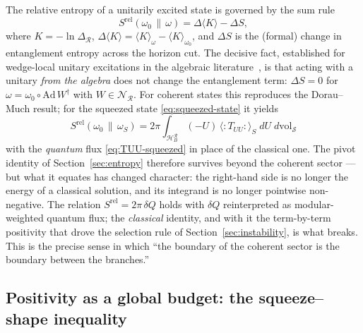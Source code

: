\documentclass[11pt]{article}
\newcommand{\Srel}{S^{\mathrm{rel}}}
\begin{document}
The relative entropy of a unitarily excited state is governed by the sum rule
\begin{equation}
\Srel(\omega_0\,\|\,\omega)
= \Delta\langle K \rangle - \Delta S,
\label{eq:sumrule}
\end{equation}
where $K = -\ln \Delta_{\mathcal{R}}$, $\Delta\langle K\rangle = \langle K \rangle_\omega - \langle K\rangle_{\omega_0}$, and $\Delta S$ is the (formal) change in entanglement entropy across the horizon cut. The decisive fact, established for wedge-local unitary excitations in the algebraic literature~\cite{FLPW,Longo2019,CLR}, is that acting with a unitary \emph{from the algebra} does not change the entanglement term: $\Delta S = 0$ for $\omega = \omega_0 \circ \mathrm{Ad}\,W^\dagger$ with $W \in \mathscr{N}_{\mathcal{R}}$. For coherent states this reproduces the Dorau--Much result; for the squeezed state \eqref{eq:squeezed-state} it yields
\begin{equation}
\boxed{\;
\Srel(\omega_0\,\|\,\omega_S)
= 2\pi \int_{\mathcal{H}_B^{\mathcal{R}}} (-U)\,
\big\langle{:}T_{UU}{:}\big\rangle_{S}\; dU\; d\mathrm{vol}_{\mathcal{S}}
\;}
\label{eq:pivot-squeezed}
\end{equation}
with the \emph{quantum} flux \eqref{eq:TUU-squeezed} in place of the classical one. The pivot identity of Section~\ref{sec:entropy} therefore survives beyond the coherent sector --- but what it equates has changed character: the right-hand side is no longer the energy of a classical solution, and its integrand is no longer pointwise non-negative. The relation $\Srel = 2\pi\,\delta Q$ holds with $\delta Q$ reinterpreted as modular-weighted quantum flux; the \emph{classical} identity, and with it the term-by-term positivity that drove the selection rule of Section~\ref{sec:instability}, is what breaks. This is the precise sense in which ``the boundary of the coherent sector is the boundary between the branches.''

\subsection{Positivity as a global budget: the squeeze--shape inequality}
\label{app:budget}
\end{document}
